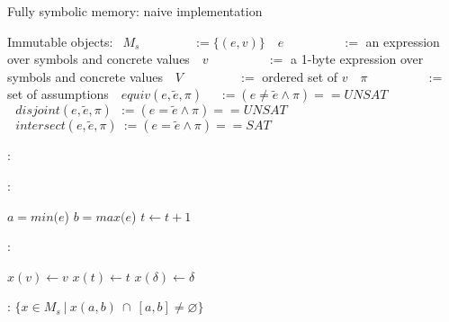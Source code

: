 \documentclass{article}
\let\emptyset\varnothing
\begin{document}
\begin{algorithm}
  \normalsize

  \caption{Fully symbolic memory: naive implementation}
  \begin{algorithmic}
  	\State Immutable objects:
  	\State $~~M_s~~~~~~~~~~~~~~~~~~~:= \{(e,v)\}$ 
  	\State $~~~e~~~~~~~~~~~~~~~~~~~\,~:=$ an expression over symbols and concrete values
  	\State $~~~v~~~~~~~~~~~~~~~~~~~~\,:=$ a 1-byte expression over symbols and concrete values
  	\State $~~~V~~~~~~~~~~~~~~~~~~~\,:=$ ordered set of $v$
  	\State $~~~\pi~~~~~~~~~~~~~~~~~~~~\,:=$ set of assumptions
  	\State $~~~equiv(e, \widetilde{e}, \pi)~~~~~\,:= (e \not = \widetilde{e} \wedge \pi) == UNSAT$ 
  	\State $~~~disjoint(e, \widetilde{e}, \pi)~~:=  (e = \widetilde{e} \wedge \pi) == UNSAT$ 
  	\State $~~~intersect(e, \widetilde{e}, \pi)~:=  (e = \widetilde{e} \wedge \pi) == SAT$ 

  \end{algorithmic}

  \bigskip
  
  \begin{algorithmic}[1]
	:
			\State {}
		\EndFor
	\EndFunction
  \end{algorithmic}

  \bigskip

  \begin{algorithmic}[1]
	:
		
		\State $a = min(e$)
		\State $b = max(e$)
		\State $t \leftarrow t + 1$
		\State {}

	\EndFunction
  \end{algorithmic}

  \bigskip

  \begin{algorithmic}[1]
	:
		
				\State $x(v) \leftarrow v$
				\State $x(t) \leftarrow t$
				\State $x(\delta) \leftarrow \delta$
				\State \Return
			\EndIf
		\EndFor
		\State {}
	\EndFunction
  \end{algorithmic}

  \bigskip

  \begin{algorithmic}[1]
	:
		\State \Return $\{x \in M_s~|~x(a,b)~\cap~[a, b] \neq \emptyset\}$
	\EndFunction
  \end{algorithmic}

\end{algorithm}
  
\end{document}
